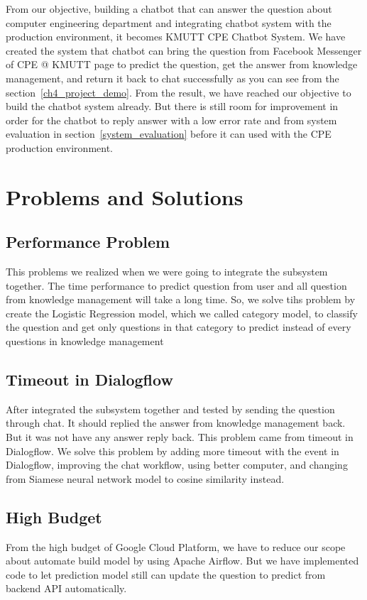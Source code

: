 \documentclass[12pt,oneside,openright,a4paper]{cpe-english-project}
\begin{document}
From our objective, building a chatbot that can answer the question about computer engineering department
and integrating chatbot system with the production environment, it becomes KMUTT CPE Chatbot System.
We have created the system that chatbot can bring the question from Facebook Messenger of CPE @ KMUTT page
to predict the question, get the answer from knowledge management, and return it back to chat successfully
as you can see from the section~\ref*{ch4_project_demo}.
From the result, we have reached our objective to build the chatbot system already.
But there is still room for improvement in order
for the chatbot to reply answer with a low error rate and from system evaluation in section~\ref*{system_evaluation} before it can used with the CPE production environment.

\section{Problems and Solutions}
\subsection{Performance Problem}
This problems we realized when we were going to integrate the subsystem together.
The time performance to predict question from user and all question from knowledge management
will take a long time. So, we solve tihs problem by create the Logistic Regression model,
which we called category model, to classify the question and get only questions in that
category to predict instead of every questions in knowledge management

\subsection{Timeout in Dialogflow}
\label{ch5_timeout_dialogflow}
After integrated the subsystem together and tested by sending the question through chat.
It should replied the answer from knowledge management back.
But it was not have any answer reply back. This problem came from timeout in Dialogflow.
We solve this problem by adding more timeout with the event in Dialogflow, improving the
chat workflow, using better computer,
and changing from Siamese neural network model to cosine similarity instead.

\subsection{High Budget}
From the high budget of Google Cloud Platform, we have to reduce our scope about automate build model
by using Apache Airflow. But we have implemented code to let prediction model still can update the
question to predict from backend API automatically.
\end{document}
